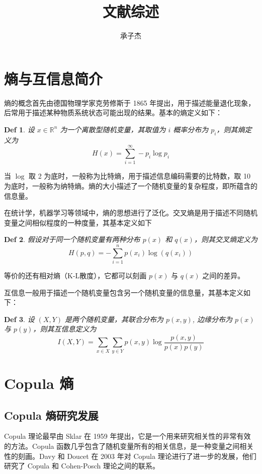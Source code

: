 \documentclass[a4paper]{ctexart}
\title{文献综述}
\author{承子杰}
\date{}
\begin{document}
\newtheorem{definition}{Def}
\newtheorem{theorem}{Thm}

\maketitle

\section{熵与互信息简介}
熵的概念首先由德国物理学家克劳修斯于 1865 年提出，用于描述能量退化现象，后常用于描述某种物质系统状态可能出现的结果。基本的熵定义如下：
\begin{definition}
	设 $x\in\mathbb{R}^n$ 为一个离散型随机变量，其取值为 $i$ 概率分布为 $p_i$，则其熵定义为
	\begin{equation}
		H(x) = \sum\limits_{i=1}^\infty -p_i\log p_i
	\end{equation}
\end{definition}
 当 $\log$ 取 2 为底时，一般称为比特熵，用于描述信息编码需要的比特数，取 10 为底时，一般称为纳特熵。熵的大小描述了一个随机变量的复杂程度，即所蕴含的信息量。
 
 在统计学，机器学习等领域中，熵的思想进行了泛化。交叉熵是用于描述不同随机变量之间相似程度的一种度量，其基本定义如下
 \begin{definition}
	假设对于同一个随机变量有两种分布 $p(x)$ 和 $q(x)$，则其交叉熵定义为
	\begin{equation}
		H(p,q) = -\sum\limits_{i=1}^n p(x_i)\log(q(x_i))
	\end{equation}
 \end{definition}
 等价的还有相对熵（K-L散度），它都可以刻画 $p(x)$ 与 $q(x)$ 之间的差异。

 互信息一般用于描述一个随机变量包含另一个随机变量的信息量，其基本定义如下：
 \begin{definition}
	设 $(X,Y)$ 是两个随机变量，其联合分布为 $p(x,y)$, 边缘分布为 $p(x)$ 与 $p(y)$，则其互信息定义为
	\begin{equation}
		I(X,Y) = \sum\limits_{x\in X}\sum\limits_{y \in Y}p(x,y)\log\dfrac{p(x,y)}{p(x)p(y)}
	\end{equation}
 \end{definition}
\section{Copula 熵}

\subsection{Copula 熵研究发展}
Copula 理论最早由 Sklar\cite{ref1} 在 1959 年提出，它是一个用来研究相关性的非常有效的方法。Copula 函数几乎包含了随机变量所有的相关信息，是一种变量之间相关性的刻画。Davy 和 Doucet\cite{ref2} 在 2003 年对 Copula 理论进行了进一步的发展，他们研究了 Copula 和 Cohen-Posch 理论之间的联系。
\end{document}
